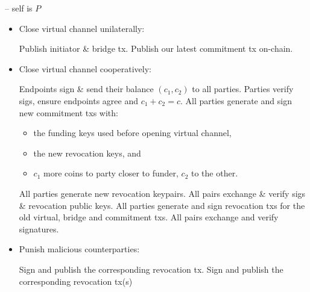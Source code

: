 \begin{center}
\begin{processbox}{\pchan -- self is $P$}
\begin{itemize}
      \item Close virtual channel unilaterally:
      \begin{algorithmic}[0]
        \State Publish initiator \& bridge tx. 
        \State Publish our latest commitment tx on-chain.
      \end{algorithmic}

      \item Close virtual channel cooperatively: 
      \begin{algorithmic}[0]
        \State Endpoints sign \& send their balance $(c_1, c_2)$ to all
        parties.
        \State Parties verify sigs, ensure endpoints agree and $c_1 + c_2 = c$.
        \State All parties generate and sign new commitment txs with:
        \begin{itemize}
          \item the funding keys used before opening virtual channel,
          \item the new revocation keys, and
          \item $c_1$ more coins to party closer to funder, $c_2$ to the
          other.
        \end{itemize}
        \State All parties generate new revocation keypairs.
        \State All pairs exchange \& verify sigs \& revocation public keys.
        \State All parties generate and sign revocation txs for the old virtual,
        bridge and commitment txs.
        \State All pairs exchange and verify signatures.
      \end{algorithmic}

      \item Punish malicious counterparties: 
      \begin{algorithmic}[0]
          \State Sign and publish the corresponding revocation tx.
        \EndIf
          \State Sign and publish the corresponding revocation tx(s)
        \EndIf
      \end{algorithmic}
    \end{itemize}
  \end{processbox}
  \label{code:pseudocode}
\end{center}
